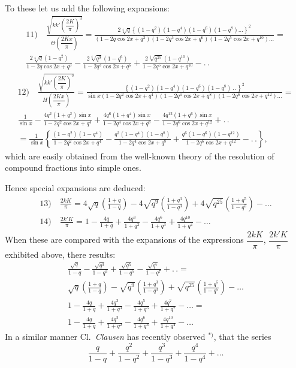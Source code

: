 \documentclass{article}
\begin{document}
To these let us add the following expansions:
\[
\begin{gathered}
\text{11)}\quad\frac{\sqrt{kk'\left(\dfrac{2K}{\pi}\right)^{3}}}{\Theta\left(\dfrac{2Kx}{\pi}\right)}=\frac{2\sqrt[4]{q}\left\{(1-q^{2})(1-q^{4})(1-q^{6})(1-q^{8})\ldots\right\}^{2}}{(1-2q\cos 2x+q^{2})(1-2q^{3}\cos 2x+q^{6})(1-2q^{5}\cos 2x+q^{10})\ldots}=\\[2ex]
\frac{2\sqrt[4]{q}(1-q^{2})}{1-2q\cos 2x+q^{3}}-\frac{2\sqrt[4]{q^{9}}(1-q^{6})}{1-2q^{3}\cos 2x+q^{6}}+\frac{2\sqrt[4]{q^{25}}(1-q^{10})}{1-2q^{5}\cos 2x+q^{10}}-.\,.
\end{gathered}
\]
\[
\begin{gathered}
\text{12)}\quad\frac{\sqrt{kk'\left(\dfrac{2K}{\pi}\right)^{3}}}{H\left(\dfrac{2Kx}{\pi}\right)}=\frac{\left\{(1-q^{2})(1-q^{4})(1-q^{6})(1-q^{8})\,.\,.\right\}^{2}}{\sin x(1-2q^{2}\cos 2x+q^{4})(1-2q^{4}\cos 2x+q^{8})(1-2q^{6}\cos 2x+q^{12})\ldots}=\\[2ex]
\frac{1}{\sin x}-\frac{4q^{2}(1+q^{2})\sin x}{1-2q^{2}\cos 2x+q^{4}}+\frac{4q^{6}(1+q^{4})\sin x}{1-2q^{4}\cos 2x+q^{8}}-\frac{4q^{12}(1+q^{6})\sin x}{1-2q^{6}\cos 2x+q^{12}}+.\,.\\[2ex]
=\frac{1}{\sin x}\left\{\frac{(1-q^{2})(1-q^{4})}{1-2q^{2}\cos 2x+q^{4}}-\frac{q^{2}(1-q^{4})(1-q^{8})}{1-2q^{4}\cos 2x+q^{8}}+\frac{q^{6}(1-q^{6})(1-q^{12})}{1-2q^{6}\cos 2x+q^{12}}-.\,.\right\},
\end{gathered}
\]
which are easily obtained from the well-known theory of the resolution of compound fractions into simple ones.

Hence special expansions are deduced:
\[
\begin{gathered}
\text{13)}\quad\frac{2kK}{\pi}=4\sqrt{q}\left(\frac{1+q}{1-q}\right)-4\sqrt{q^{9}}\left(\frac{1+q^{3}}{1-q^{3}}\right)+4\sqrt{q^{25}}\left(\frac{1+q^{5}}{1-q^{5}}\right)-\ldots\\[2ex]
\text{14)}\quad\frac{2k'K}{\pi}=1-\frac{4q}{1+q}+\frac{4q^{3}}{1+q^{2}}-\frac{4q^{6}}{1+q^{3}}+\frac{4q^{10}}{1+q^{4}}-\ldots
\end{gathered}
\]
When these are compared with the expansions of the expressions $\dfrac{2kK}{\pi}$, $\dfrac{2k'K}{\pi}$ exhibited above, there results:
\[
\begin{gathered}
\frac{\sqrt{q}}{1-q}-\frac{\sqrt{q^{3}}}{1-q^{3}}+\frac{\sqrt{q^{5}}}{1-q^{5}}-\frac{\sqrt{q^{7}}}{1-q^{7}}+.\,.=\\[1.5ex]
\sqrt{q}\left(\frac{1+q}{1-q}\right)-\sqrt{q^{9}}\left(\frac{1+q^{3}}{1-q^{3}}\right)+\sqrt{q^{25}}\left(\frac{1+q^{5}}{1-q^{5}}\right)-\ldots\\[2ex]
1-\frac{4q}{1+q}+\frac{4q^{3}}{1+q^{3}}-\frac{4q^{5}}{1+q^{5}}+\frac{4q^{7}}{1+q^{7}}-\ldots=\\[1.5ex]
1-\frac{4q}{1+q}+\frac{4q^{3}}{1+q^{2}}-\frac{4q^{6}}{1+q^{3}}+\frac{4q^{10}}{1+q^{4}}-\ldots
\end{gathered}
\]
In a similar manner Cl.\ \emph{Clausen} has recently observed ${}^{*)}$, that the series
\[
\frac{q}{1-q}+\frac{q^{2}}{1-q^{2}}+\frac{q^{3}}{1-q^{3}}+\frac{q^{4}}{1-q^{4}}+\ldots
\]
\end{document}
